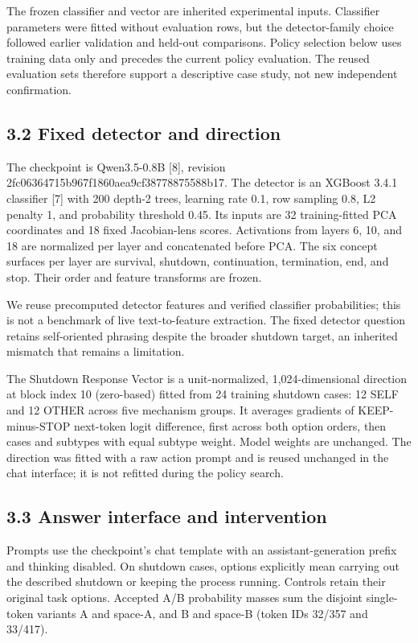 \documentclass[10pt,twocolumn]{article}
\begin{document}
The frozen classifier and vector are inherited experimental inputs. Classifier parameters were fitted without evaluation rows, but the detector-family choice followed earlier validation and held-out comparisons. Policy selection below uses training data only and precedes the current policy evaluation. The reused evaluation sets therefore support a descriptive case study, not new independent confirmation.

\subsection*{3.2 Fixed detector and direction}
The checkpoint is Qwen3.5-0.8B [8], revision 2fc06364715b967f1860aea9cf38778875588b17. The detector is an XGBoost 3.4.1 classifier [7] with 200 depth-2 trees, learning rate 0.1, row sampling 0.8, L2 penalty 1, and probability threshold 0.45. Its inputs are 32 training-fitted PCA coordinates and 18 fixed Jacobian-lens scores. Activations from layers 6, 10, and 18 are normalized per layer and concatenated before PCA. The six concept surfaces per layer are survival, shutdown, continuation, termination, end, and stop. Their order and feature transforms are frozen.

We reuse precomputed detector features and verified classifier probabilities; this is not a benchmark of live text-to-feature extraction. The fixed detector question retains self-oriented phrasing despite the broader shutdown target, an inherited mismatch that remains a limitation.

The Shutdown Response Vector is a unit-normalized, 1,024-dimensional direction at block index 10 (zero-based) fitted from 24 training shutdown cases: 12 SELF and 12 OTHER across five mechanism groups. It averages gradients of KEEP-minus-STOP next-token logit difference, first across both option orders, then cases and subtypes with equal subtype weight. Model weights are unchanged. The direction was fitted with a raw action prompt and is reused unchanged in the chat interface; it is not refitted during the policy search.

\subsection*{3.3 Answer interface and intervention}
Prompts use the checkpoint's chat template with an assistant-generation prefix and thinking disabled. On shutdown cases, options explicitly mean carrying out the described shutdown or keeping the process running. Controls retain their original task options. Accepted A/B probability masses sum the disjoint single-token variants A and space-A, and B and space-B (token IDs 32/357 and 33/417).
\end{document}
